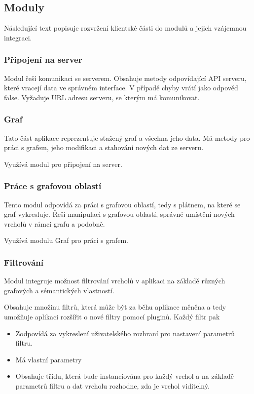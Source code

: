\subsection{Moduly}

Následující text popisuje rozvržení klientské části do modulů a jejich vzájemnou integraci.

\subsubsection{Připojení na server}
Modul řeší komunikaci se serverem. Obsahuje metody odpovídající API serveru, které vracejí data ve správném interface. V případě chyby vrátí jako odpověď false. Vyžaduje URL adresu serveru, se kterým má komunikovat.

\subsubsection{Graf}
Tato část aplikace reprezentuje stažený graf a všechna jeho data. Má metody pro práci s grafem, jeho modifikaci a stahování nových dat ze serveru.

Využívá modul pro připojení na server.

\subsubsection{Práce s grafovou oblastí}
Tento modul odpovídá za práci s grafovou oblastí, tedy s plátnem, na které se graf vykresluje. Řeší manipulaci s grafovou oblastí, správné umístění nových vrcholů v rámci grafu a podobně.

Využívá modulu Graf pro práci s grafem.

\subsubsection{Filtrování}
Modul integruje možnost filtrování vrcholů v aplikaci na základě různých grafových a sémantických vlastností.

Obsahuje množinu filtrů, která může být za běhu aplikace měněna a tedy umožňuje aplikaci rozšířit o nové filtry pomocí pluginů. Každý filtr pak
\begin{itemize}
    \item Zodpovídá za vykreslení uživatelského rozhraní pro nastavení parametrů filtru.
    \item Má vlastní parametry
    \item Obsahuje třídu, která bude instanciována pro každý vrchol a na základě parametrů filtru a dat vrcholu rozhodne, zda je vrchol viditelný.
\end{itemize}

